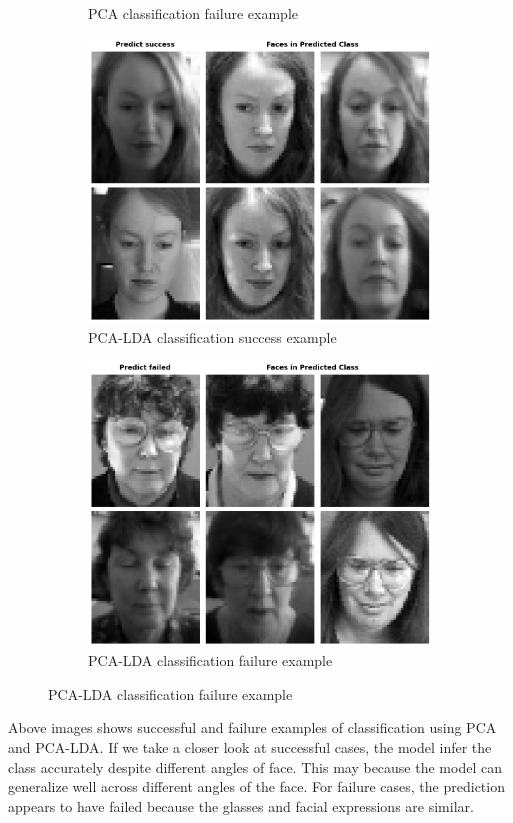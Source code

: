 \begin{figure}[htbp]
\begin{subfigure}[t]{0.4\linewidth}
	\caption{PCA classification failure example}
	\label{fig:q3_fail}
        \end{subfigure}
    \quad
	\begin{subfigure}[t]{0.4\linewidth}
	\centering
	\includegraphics[width=\linewidth]{image/q3_success.png}
	\caption{PCA-LDA classification success example}
	\label{fig:q3_success}
        \end{subfigure}
    \quad
        \begin{subfigure}[t]{0.4\linewidth}
	\centering
	\includegraphics[width=\linewidth]{image/q3_fail.png}
	\caption{PCA-LDA classification failure example}
	\label{fig:q3_fail}
    \end{subfigure}
\end{figure}
Above images shows successful and failure examples of classification using PCA and PCA-LDA. If we take a closer look at successful cases, the model infer the class accurately despite different angles of face. This may because the model can generalize well across different angles of the face. For failure cases, the prediction appears to have failed because the glasses and facial expressions are similar.

